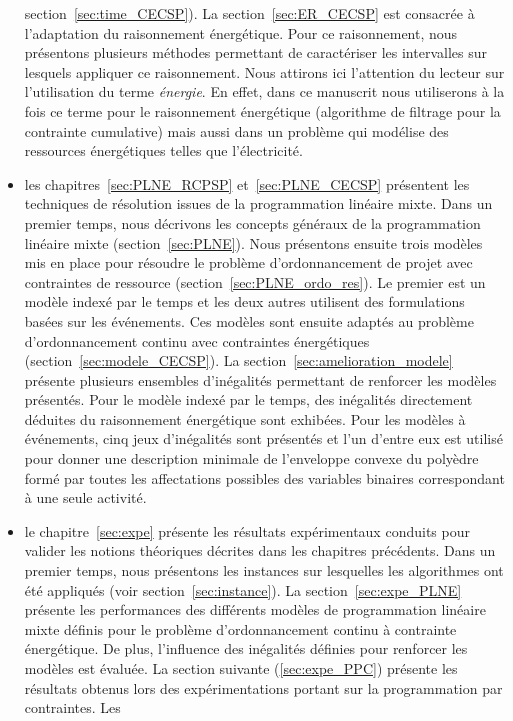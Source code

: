 \begin{itemize}
  section~\ref{sec:time_CECSP}). La section~\ref{sec:ER_CECSP} est
  consacrée à l'adaptation du raisonnement énergétique. Pour ce
  raisonnement, nous présentons plusieurs méthodes permettant de
  caractériser les intervalles sur lesquels appliquer ce
  raisonnement. Nous attirons ici l'attention du lecteur sur
  l'utilisation du terme {\it énergie}. En effet, dans ce manuscrit
  nous utiliserons à la fois ce terme pour le raisonnement
  énergétique (algorithme de filtrage pour la contrainte cumulative)
  mais aussi dans un problème qui modélise des ressources énergétiques
  telles que l'électricité.
\item les chapitres~\ref{sec:PLNE_RCPSP} et~\ref{sec:PLNE_CECSP}
  présentent les techniques de résolution issues de la programmation
  linéaire mixte. Dans un premier temps, nous décrivons les concepts généraux
  de la programmation linéaire mixte (section~\ref{sec:PLNE}). Nous
  présentons ensuite trois modèles mis en place pour
  résoudre le problème d'ordonnancement de projet avec contraintes de
  ressource (section~\ref{sec:PLNE_ordo_res}). Le premier est un
  modèle indexé par le temps et les deux autres utilisent des
  formulations basées sur les événements. Ces modèles sont
  ensuite adaptés au problème d'ordonnancement continu
avec contraintes énergétiques (section~\ref{sec:modele_CECSP}). La 
section~\ref{sec:amelioration_modele} présente plusieurs
ensembles d'inégalités permettant de renforcer les modèles
présentés. Pour le modèle indexé par le temps, des inégalités
directement déduites du raisonnement énergétique sont exhibées. Pour
les modèles à événements, cinq jeux d'inégalités sont présentés et
l'un d'entre eux est utilisé pour donner une description minimale de
l'enveloppe convexe du polyèdre formé par toutes les affectations
possibles des variables binaires correspondant à une seule activité.
\item le chapitre~\ref{sec:expe} présente les résultats expérimentaux
  conduits pour valider les notions théoriques décrites dans les
  chapitres précédents. Dans un premier temps, nous présentons les
instances sur lesquelles les algorithmes ont été appliqués (voir
section~\ref{sec:instance}). La section~\ref{sec:expe_PLNE} présente
les performances des différents modèles de programmation linéaire
mixte définis pour le problème d'ordonnancement continu à contrainte
énergétique. De plus, l'influence des inégalités définies pour
renforcer les modèles est évaluée. La section suivante
(\ref{sec:expe_PPC}) présente les résultats obtenus lors des
expérimentations portant sur la programmation par contraintes. Les

\end{itemize}
